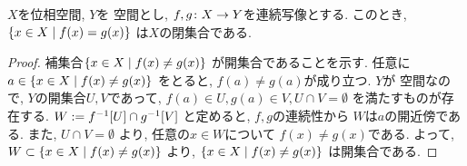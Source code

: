 \documentclass[uplatex, dvipdfmx, a4paper, 12pt, class=jsbook, crop=false]{standalone}
\begin{document}
\begin{proposition}
	\label{h00001}
	\( X \)を位相空間, \( Y \)を \Hausdorff 空間とし,
	\( f,g\colon X\to Y \)を連続写像とする.
	このとき, \( \setcomp{x \in X}{f(x) = g(x)} \)
	は\( X \)の閉集合である.
\end{proposition}

\begin{proof}
	補集合\( \setcomp{x \in X}{f(x) \neq g(x)} \)
	が開集合であることを示す.
	任意に\( a \in \setcomp{x \in X}{f(x) \neq g(x)} \)
	をとると, \( f(a) \neq g(a) \)が成り立つ.
	\( Y \)が \Hausdorff 空間なので,
	\( Y \)の開集合\( U, V \)であって,
	\( f(a) \in U, g(a) \in V, U \cap V = \emptyset \)
	を満たすものが存在する.
	\( W \defeq \mapinvset{f}{U} \cap \mapinvset{g}{V} \)
	と定めると, \( f, g \)の連続性から
	\( W \)は\( a \)の開近傍である.
	また, \( U \cap V = \emptyset \)
	より, 任意の\( x \in W \)について
	\( f(x) \neq g(x) \)である.
	よって, \( W \subset \setcomp{x \in X}{f(x) \neq g(x)} \)
	より, \( \setcomp{x \in X}{f(x) \neq g(x)} \)
	は開集合である.
\end{proof}
\end{document}
